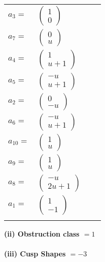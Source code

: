 \documentclass[1p]{elsarticle_modified}
\theoremstyle{definition}
\begin{document}
\begin{tabular}{m{7pt} m{180pt} m{7pt} m{180pt} }
\flushright $a_{3}=$&$\begin{pmatrix}1\\0\end{pmatrix}$ \\
\flushright $a_{7}=$&$\begin{pmatrix}0\\u\end{pmatrix}$ \\
\flushright $a_{4}=$&$\begin{pmatrix}1\\u+1\end{pmatrix}$ \\
\flushright $a_{5}=$&$\begin{pmatrix}- u\\u+1\end{pmatrix}$ \\
\flushright $a_{2}=$&$\begin{pmatrix}0\\- u\end{pmatrix}$ \\
\flushright $a_{6}=$&$\begin{pmatrix}- u\\u+1\end{pmatrix}$ \\
\flushright $a_{10}=$&$\begin{pmatrix}1\\u\end{pmatrix}$ \\
\flushright $a_{9}=$&$\begin{pmatrix}1\\u\end{pmatrix}$ \\
\flushright $a_{8}=$&$\begin{pmatrix}- u\\2 u+1\end{pmatrix}$ \\
\flushright $a_{1}=$&$\begin{pmatrix}1\\-1\end{pmatrix}$\\&\end{tabular}
\flushleft \textbf{(ii) Obstruction class $= 1$}\\~\\
\flushleft \textbf{(iii) Cusp Shapes $= -3$}\\~\\
\end{document}
